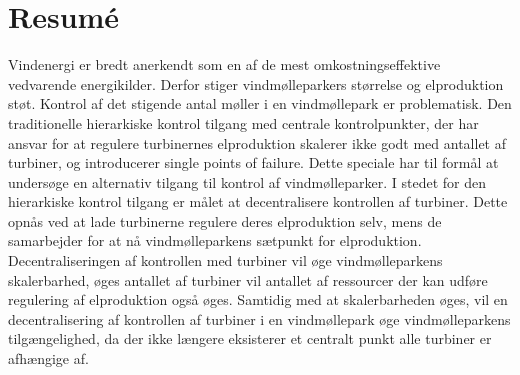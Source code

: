 \chapter{Resumé}
Vindenergi er bredt anerkendt som en af de mest omkostningseffektive vedvarende energikilder.
Derfor stiger vindmølleparkers størrelse og elproduktion støt.
Kontrol af det stigende antal møller i en vindmøllepark er problematisk.
Den traditionelle hierarkiske kontrol tilgang med centrale kontrolpunkter, der har ansvar for at regulere turbinernes elproduktion skalerer ikke godt med antallet af turbiner, og introducerer single points of failure.
Dette speciale har til formål at undersøge en alternativ tilgang til kontrol af vindmølleparker.
I stedet for den hierarkiske kontrol tilgang er målet at decentralisere kontrollen af turbiner.
Dette opnås ved at lade turbinerne regulere deres elproduktion selv, mens de samarbejder for at nå vindmølleparkens sætpunkt for elproduktion.
Decentraliseringen af kontrollen med turbiner vil øge vindmølleparkens skalerbarhed, øges antallet af turbiner vil antallet af ressourcer der kan udføre regulering af elproduktion også øges.
Samtidig med at skalerbarheden øges, vil en decentralisering af kontrollen af turbiner i en vindmøllepark øge vindmølleparkens tilgængelighed, da der ikke længere eksisterer et centralt punkt alle turbiner er afhængige af.